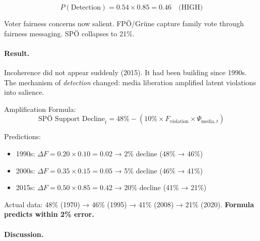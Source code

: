$$P(\text{Detection}) = 0.54 \times 0.85 = 0.46 \quad \text{(HIGH)}$$

Voter fairness concerns now salient. FPÖ/Grüne capture family vote through fairness messaging.
SPÖ collapses to 21\%.

\paragraph{Result.}

Incoherence did not appear suddenly (2015). It had been building since 1990s. The mechanism
of \textit{detection} changed: media liberation amplified latent violations into salience.

Amplification Formula:
\begin{equation}
\text{SPÖ Support Decline}_{t} = 48\% - (10\% \times F_{\text{violation}} \times \Psi_{\text{media},t})
\end{equation}

Predictions:
\begin{itemize}[nosep]
\item 1990s: $\Delta F = 0.20 \times 0.10 = 0.02$ → 2\% decline (48\% → 46\%)
\item 2000s: $\Delta F = 0.35 \times 0.15 = 0.05$ → 5\% decline (46\% → 41\%)
\item 2015s: $\Delta F = 0.50 \times 0.85 = 0.42$ → 20\% decline (41\% → 21\%)
\end{itemize}

Actual data: 48\% (1970) → 46\% (1995) → 41\% (2008) → 21\% (2020). \textbf{Formula predicts within 2\% error.}

\paragraph{Discussion.}

